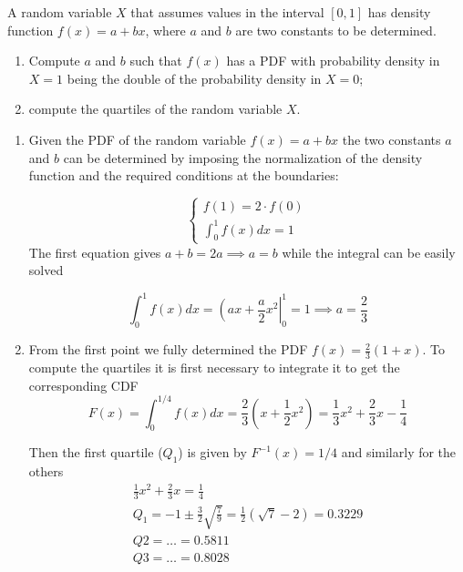 \begin{question}
A random variable $X$ that assumes values in the interval $[0, 1]$ has density function $f(x) = a + b x$,
where $a$ and $b$ are two constants to be determined.

\begin{enumerate}[label={\emph{\alph*})}]
\tightlist
\item Compute $a$ and $b$ such that $f(x)$ has a PDF with probability density in $X = 1$ being the double of the probability density in $X = 0$;
\item compute the quartiles of the random variable $X$.
\end{enumerate}
\end{question}

\begin{solution}
\begin{enumerate}[label={\emph{\alph*})}]
\tightlist
\item Given the PDF of the random variable $f(x) = a + bx$ the two constants $a$ and $b$ can be determined by imposing the normalization of the density function and the required conditions at the boundaries:

\begin{equation*}
\begin{cases}
	f(1) = 2\cdot f(0)\\
	\int_0^1 f(x)dx = 1
\end{cases}  
\end{equation*}
The first equation gives $a+b = 2a \implies a = b$ while the integral can be easily solved

\begin{equation*}
\int_0^1 f(x)dx = \left(ax + \frac{a}{2}x^2\right|^1_0 = 1 \implies a = \frac{2}{3}
\end{equation*}

\item From the first point we fully determined the PDF $f(x) = \frac{2}{3}(1 + x)$. To compute the quartiles it is first necessary to integrate it to get the corresponding CDF 
\begin{equation*}
F(x) = \int_0^{1/4} f(x)dx = \frac{2}{3}\left(x + \frac{1}{2}x^2\right) = \frac{1}{3}x^2 + \frac{2}{3} x  - \frac{1}{4}
\end{equation*}

Then the first quartile ($Q_1$) is given by $F^{-1}(x) = 1/4$ and similarly for the others
\begin{gather*}
\frac{1}{3}x^2 + \frac{2}{3} x  = \frac{1}{4} \\
Q_1 = -1 \pm \frac{3}{2}\sqrt{\frac{7}{9}} = \frac{1}{2}(\sqrt{7} - 2) = 0.3229\\
Q2 = \dots = 0.5811\\
Q3 = \dots = 0.8028
\end{gather*}
\end{enumerate}
\end{solution}

